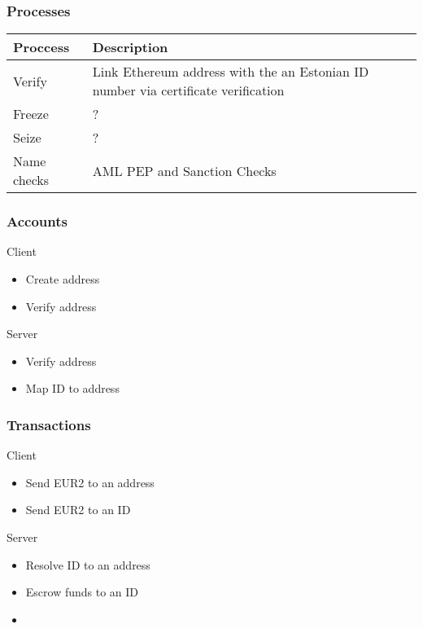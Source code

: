 \documentclass[12pt]{article} %
\begin{document}
{{\subsubsection{Processes} \label{sssec:3.3:processes}
\begin{center}
\begin{tabular}{ | p{3cm} | p{12cm} | } 
 \hline
 Proccess & Description \\
 \hline\hline
 Verify & Link Ethereum address with the an Estonian ID number via certificate verification\\
 \hline
 Freeze & ? \\
 \hline
 Seize & ? \\
 \hline
 Name checks & AML PEP and Sanction Checks \\
 \hline
\end{tabular}
\end{center}

\subsubsection{Accounts} \label{sssec:3.3:accounts}

Client
\begin{itemize}
	\item Create address
	\item Verify address
\end{itemize}

Server
\begin{itemize}
	\item Verify address
	\item Map ID to address
\end{itemize}

\subsubsection{Transactions} \label{sssec:3.3:transactions}

Client
\begin{itemize}
	\item Send EUR2 to an address
	\item Send EUR2 to an ID
\end{itemize}

Server
\begin{itemize}
	\item Resolve ID to an address
	\item Escrow funds to an ID
	\item {}
\end{itemize}

}}
\end{document}
